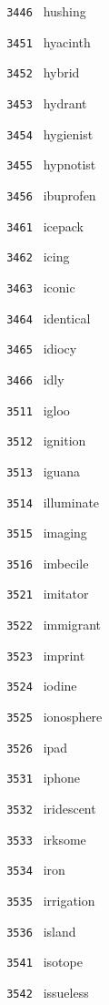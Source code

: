 \documentclass[11pt]{article}
\begin{document}
\begin{multicols}{6}
\noindent \texttt{ 3446 } hushing  \par
\noindent \texttt{ 3451 } hyacinth  \par
\noindent \texttt{ 3452 } hybrid  \par
\noindent \texttt{ 3453 } hydrant  \par
\noindent \texttt{ 3454 } hygienist  \par
\noindent \texttt{ 3455 } hypnotist  \par
\noindent \texttt{ 3456 } ibuprofen  \par
\noindent \texttt{ 3461 } icepack  \par
\noindent \texttt{ 3462 } icing  \par
\noindent \texttt{ 3463 } iconic  \par
\noindent \texttt{ 3464 } identical  \par
\noindent \texttt{ 3465 } idiocy  \par
\noindent \texttt{ 3466 } idly  \par
\noindent \texttt{ 3511 } igloo  \par
\noindent \texttt{ 3512 } ignition  \par
\noindent \texttt{ 3513 } iguana  \par
\noindent \texttt{ 3514 } illuminate  \par
\noindent \texttt{ 3515 } imaging  \par
\noindent \texttt{ 3516 } imbecile  \par
\noindent \texttt{ 3521 } imitator  \par
\noindent \texttt{ 3522 } immigrant  \par
\noindent \texttt{ 3523 } imprint  \par
\noindent \texttt{ 3524 } iodine  \par
\noindent \texttt{ 3525 } ionosphere  \par
\noindent \texttt{ 3526 } ipad  \par
\noindent \texttt{ 3531 } iphone  \par
\noindent \texttt{ 3532 } iridescent  \par
\noindent \texttt{ 3533 } irksome  \par
\noindent \texttt{ 3534 } iron  \par
\noindent \texttt{ 3535 } irrigation  \par
\noindent \texttt{ 3536 } island  \par
\noindent \texttt{ 3541 } isotope  \par
\noindent \texttt{ 3542 } issueless  \par

\end{multicols}
\end{document}
